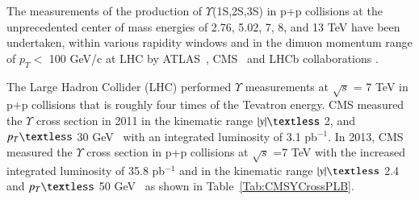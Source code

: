 The measurements of the production of $\Upsilon$(1S,2S,3S) in p+p collisions at the
unprecedented center of mass energies of 2.76, 5.02, 7, 8, and 13 TeV have been undertaken,
within various rapidity windows and in the dimuon momentum range of
$p_{T}<$ 100 GeV/c at LHC by
ATLAS~\cite{ATLAS:2011nal,ATLAS:2012lmu},
CMS~\cite{CMS:2013qur,CMS:2017dju} and LHCb collaborations \cite{LHCb:2018yzj}.

 The Large Hadron Collider (LHC) performed $\Upsilon$ measurements at 
$\surd s$ = 7 TeV in p+p collisions that is roughly four times of the Tevatron energy. 
CMS measured the $\Upsilon$ cross section in 2011 in the kinematic range 
$|y|\textless$ 2, and $p_{T} \textless$ 30 GeV~\cite{CMS:2010wld} 
with an integrated luminosity of 3.1 pb$^{-1}$.
  In 2013, CMS measured the $\Upsilon$ cross section in p+p collisions at $\surd s$ =7 TeV
with the increased integrated luminosity of 35.8 pb$^{-1}$ and in the kinematic range
$|y|\textless$ 2.4 and $p_{T}\textless$ 50 GeV~\cite{CMS:2015xqv} as shown in
Table~\ref{Tab:CMSYCrossPLB}.






